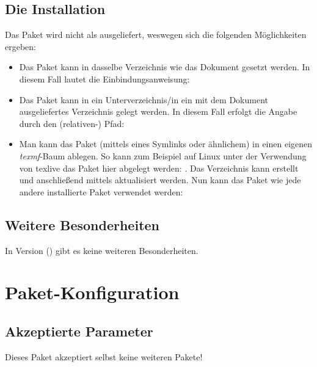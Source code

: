 \documentclass{sopra-base}
\begin{document}
\subsection{Die Installation}
    Das Paket wird nicht als  ausgeliefert, weswegen sich die
    folgenden Möglichkeiten ergeben:
    \begin{itemize}
        \item Das Paket kann in dasselbe Verzeichnis wie das Dokument
                gesetzt werden. In diesem Fall lautet die Einbindungsanweisung:
\begin{plainlatex}
\usepackage{sopra-models}
\end{plainlatex}
        \item Das Paket kann in ein Unterverzeichnis/in ein mit
                dem Dokument ausgeliefertes Verzeichnis gelegt werden. In
                diesem Fall erfolgt die Angabe durch den (relativen-) Pfad:
\begin{plainlatex}
\usepackage{./Mein/Pfad/zu/sopra-models}
\end{plainlatex}
        \item Man kann das Paket (mittels eines Symlinks oder ähnlichem)
              in einen eigenen \emph{texmf}-Baum ablegen.
              So kann zum Beispiel auf Linux unter der Verwendung von texlive
              das Paket hier abgelegt werden: .
              Das Verzeichnis kann erstellt und anschließend mittels
               aktualisiert werden. Nun kann
              das Paket wie jede andere installierte Paket verwendet werden:
\begin{plainlatex}
\usepackage{sopra-models}
\end{plainlatex}
    \end{itemize}

\subsection{Weitere Besonderheiten}
In Version \thesomversion{} () gibt es keine weiteren
Besonderheiten.

\section{Paket-Konfiguration}
    \subsection{Akzeptierte Parameter}
    Dieses Paket akzeptiert selbst keine weiteren Pakete!
\end{document}
